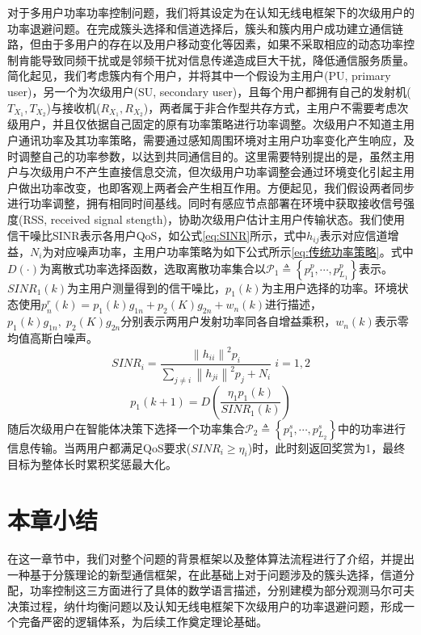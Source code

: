 对于多用户功率功率控制问题，我们将其设定为在认知无线电框架下的次级用户的功率退避问题。在完成簇头选择和信道选择后，簇头和簇内用户成功建立通信链路，但由于多用户的存在以及用户移动变化等因素，如果不采取相应的动态功率控制肯能导致同频干扰或是邻频干扰对信息传递造成巨大干扰，降低通信服务质量。简化起见，我们考虑簇内有个用户，并将其中一个假设为主用户(PU, primary user)，另一个为次级用户(SU, secondary user)，且每个用户都拥有自己的发射机($T_{X_{1}},T_{X_{2}}$)与接收机($R_{X_{1}},R_{X_{2}}$)，两者属于非合作型共存方式，主用户不需要考虑次级用户，并且仅依据自己固定的原有功率策略进行功率调整。次级用户不知道主用户通讯功率及其功率策略，需要通过感知周围环境对主用户功率变化产生响应，及时调整自己的功率参数，以达到共同通信目的。这里需要特别提出的是，虽然主用户与次级用户不产生直接信息交流，但次级用户功率调整会通过环境变化引起主用户做出功率改变，也即客观上两者会产生相互作用。方便起见，我们假设两者同步进行功率调整，拥有相同时间基线。同时有感应节点部署在环境中获取接收信号强度(RSS, received signal stength)，协助次级用户估计主用户传输状态。我们使用信干噪比SINR表示各用户QoS，如公式\ref{eq:SINR}所示，式中$h_{ij}$表示对应信道增益，$N_{i}$为对应噪声功率，主用户功率策略\cite{Grandhi1998Constrained}为如下公式所示\ref{eq:传统功率策略}。式中$D\left ( \cdot  \right )$为离散式功率选择函数，选取离散功率集合以$\mathcal{P}_{1}\triangleq\left \{ p_{1}^{p},\cdots,p_{L_{1}}^{p} \right \}$表示。$SINR_{1}(k)$为主用户测量得到的信干噪比，$p_{1}(k)$为主用户选择的功率。环境状态使用$p_{n}^{r}(k)=p_{1}(k)g_{1n}+p_{2}(K)g_{2n}+w_{n}(k)$进行描述，$p_{1}(k)g_{1n},\;p_{2}(K)g_{2n}$分别表示两用户发射功率同各自增益乘积，$w_{n}(k)$表示零均值高斯白噪声。
\begin{equation}\label{eq:SINR}
SINR_{i}=\frac{\left \| h_{ii} \right \|^{2}p_{i}}{\sum_{j\neq i}\left \| h_{ji} \right \|^2p_{j}+N_{i}}\; i=1,2 
\end{equation}
\begin{equation}\label{eq:传统功率策略}
p_{1}\left ( k+1 \right )=D\left ( \frac{\eta _{1}p_{1}\left ( k \right )}{SINR_{1}\left ( k \right )} \right )
\end{equation}
随后次级用户在智能体决策下选择一个功率集合$\mathcal{P}_{2}\triangleq\left \{ p_{1}^{s},\cdots,p_{L_{2}}^{s} \right \}$中的功率进行信息传输。当两用户都满足QoS要求($SINR_{i}\geqslant\eta_{i}$)时，此时刻返回奖赏为1，最终目标为整体长时累积奖惩最大化。
\section{本章小结}
在这一章节中，我们对整个问题的背景框架以及整体算法流程进行了介绍，并提出一种基于分簇理论的新型通信框架，在此基础上对于问题涉及的簇头选择，信道分配，功率控制这三方面进行了具体的数学语言描述，分别建模为部分观测马尔可夫决策过程，纳什均衡问题以及认知无线电框架下次级用户的功率退避问题，形成一个完备严密的逻辑体系，为后续工作奠定理论基础。









